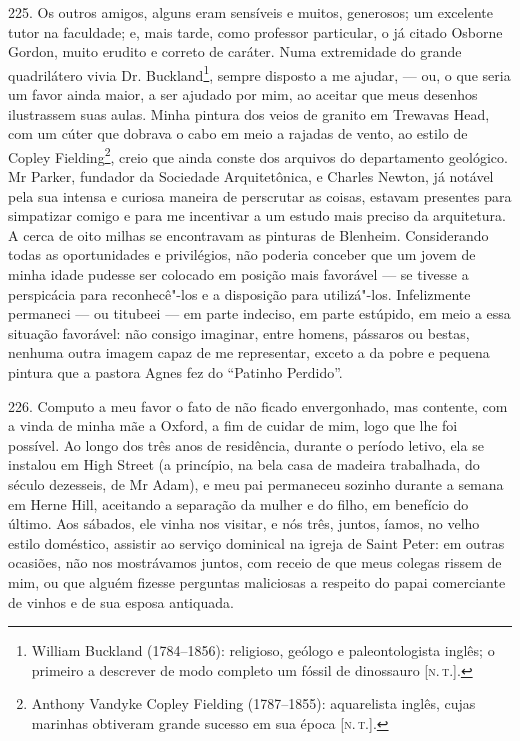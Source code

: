225. Os outros amigos, alguns eram sensíveis e muitos, generosos; um
excelente tutor na faculdade; e, mais tarde, como professor particular,
o já citado Osborne Gordon, muito erudito e correto de caráter. Numa
extremidade do grande quadrilátero vivia Dr. Buckland\footnote{William
  Buckland (1784--1856): religioso, geólogo e paleontologista inglês; o
  primeiro a descrever de modo completo um fóssil de dinossauro {[}\textsc{n.\,t.}{]}.}, sempre disposto a me ajudar, --- ou, o que seria um favor
ainda maior, a ser ajudado por mim, ao aceitar que meus desenhos
ilustrassem suas aulas. Minha pintura dos veios de granito em Trewavas
Head, com um cúter que dobrava o cabo em meio a rajadas de vento, ao
estilo de Copley Fielding\footnote{Anthony Vandyke Copley Fielding
  (1787--1855): aquarelista inglês, cujas marinhas obtiveram grande
  sucesso em sua época {[}\textsc{n.\,t.}{]}.}, creio que ainda conste dos
arquivos do departamento geológico. Mr Parker, fundador da Sociedade
Arquitetônica, e Charles Newton, já notável pela sua intensa e curiosa
maneira de perscrutar as coisas, estavam presentes para simpatizar
comigo e para me incentivar a um estudo mais preciso da arquitetura. A
cerca de oito milhas se encontravam as pinturas de Blenheim.
Considerando todas as oportunidades e privilégios, não poderia conceber
que um jovem de minha idade pudesse ser colocado em posição mais
favorável --- se tivesse a perspicácia para reconhecê"-los e a disposição
para utilizá"-los. Infelizmente permaneci --- ou titubeei --- em parte
indeciso, em parte estúpido, em meio a essa situação favorável: não
consigo imaginar, entre homens, pássaros ou bestas, nenhuma outra imagem
capaz de me representar, exceto a da pobre e pequena pintura que a
pastora Agnes fez do ``Patinho Perdido''.

226. Computo a meu favor o fato de não ficado envergonhado, mas
contente, com a vinda de minha mãe a Oxford, a fim de cuidar de mim,
logo que lhe foi possível. Ao longo dos três anos de residência, durante
o período letivo, ela se instalou em High Street (a princípio, na bela
casa de madeira trabalhada, do século dezesseis, de Mr Adam), e meu pai
permaneceu sozinho durante a semana em Herne Hill, aceitando a separação
da mulher e do filho, em benefício do último. Aos sábados, ele vinha nos
visitar, e nós três, juntos, íamos, no velho estilo doméstico, assistir
ao serviço dominical na igreja de Saint Peter: em outras ocasiões, não
nos mostrávamos juntos, com receio de que meus colegas rissem de mim, ou
que alguém fizesse perguntas maliciosas a respeito do papai comerciante
de vinhos e de sua esposa antiquada.


